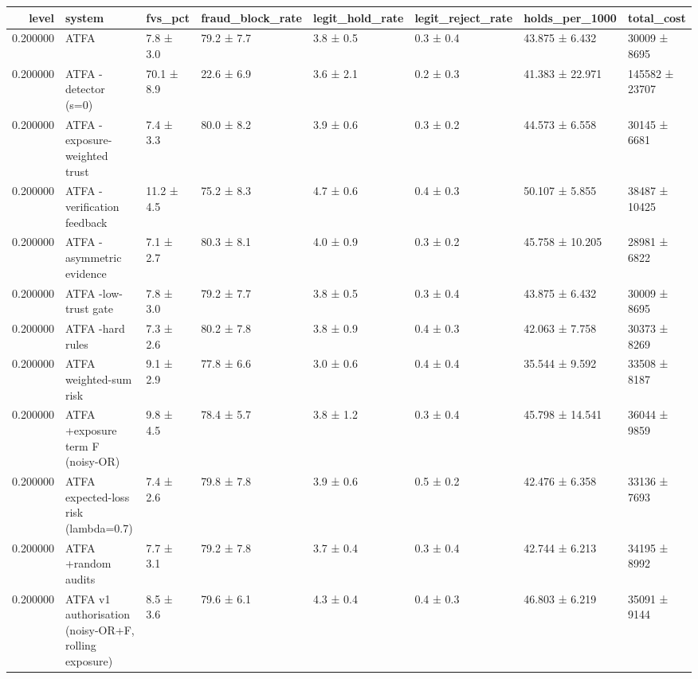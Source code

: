 \begin{tabular}{rlllllll}
\toprule
level & system & fvs\_pct & fraud\_block\_rate & legit\_hold\_rate & legit\_reject\_rate & holds\_per\_1000 & total\_cost \\
\midrule
0.200000 & ATFA & 7.8 ± 3.0 & 79.2 ± 7.7 & 3.8 ± 0.5 & 0.3 ± 0.4 & 43.875 ± 6.432 & 30009 ± 8695 \\
0.200000 & ATFA -detector (s=0) & 70.1 ± 8.9 & 22.6 ± 6.9 & 3.6 ± 2.1 & 0.2 ± 0.3 & 41.383 ± 22.971 & 145582 ± 23707 \\
0.200000 & ATFA -exposure-weighted trust & 7.4 ± 3.3 & 80.0 ± 8.2 & 3.9 ± 0.6 & 0.3 ± 0.2 & 44.573 ± 6.558 & 30145 ± 6681 \\
0.200000 & ATFA -verification feedback & 11.2 ± 4.5 & 75.2 ± 8.3 & 4.7 ± 0.6 & 0.4 ± 0.3 & 50.107 ± 5.855 & 38487 ± 10425 \\
0.200000 & ATFA -asymmetric evidence & 7.1 ± 2.7 & 80.3 ± 8.1 & 4.0 ± 0.9 & 0.3 ± 0.2 & 45.758 ± 10.205 & 28981 ± 6822 \\
0.200000 & ATFA -low-trust gate & 7.8 ± 3.0 & 79.2 ± 7.7 & 3.8 ± 0.5 & 0.3 ± 0.4 & 43.875 ± 6.432 & 30009 ± 8695 \\
0.200000 & ATFA -hard rules & 7.3 ± 2.6 & 80.2 ± 7.8 & 3.8 ± 0.9 & 0.4 ± 0.3 & 42.063 ± 7.758 & 30373 ± 8269 \\
0.200000 & ATFA weighted-sum risk & 9.1 ± 2.9 & 77.8 ± 6.6 & 3.0 ± 0.6 & 0.4 ± 0.4 & 35.544 ± 9.592 & 33508 ± 8187 \\
0.200000 & ATFA +exposure term F (noisy-OR) & 9.8 ± 4.5 & 78.4 ± 5.7 & 3.8 ± 1.2 & 0.3 ± 0.4 & 45.798 ± 14.541 & 36044 ± 9859 \\
0.200000 & ATFA expected-loss risk (lambda=0.7) & 7.4 ± 2.6 & 79.8 ± 7.8 & 3.9 ± 0.6 & 0.5 ± 0.2 & 42.476 ± 6.358 & 33136 ± 7693 \\
0.200000 & ATFA +random audits & 7.7 ± 3.1 & 79.2 ± 7.8 & 3.7 ± 0.4 & 0.3 ± 0.4 & 42.744 ± 6.213 & 34195 ± 8992 \\
0.200000 & ATFA v1 authorisation (noisy-OR+F, rolling exposure) & 8.5 ± 3.6 & 79.6 ± 6.1 & 4.3 ± 0.4 & 0.4 ± 0.3 & 46.803 ± 6.219 & 35091 ± 9144 \\
\bottomrule
\end{tabular}
